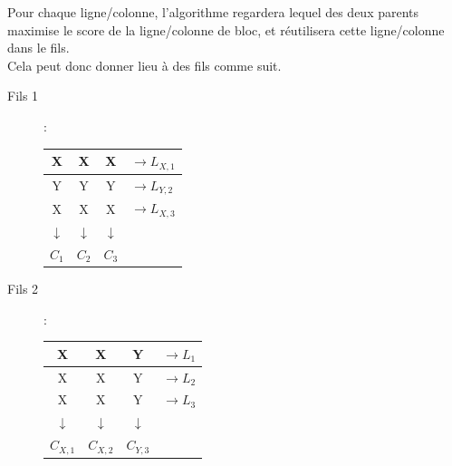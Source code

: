                     Pour chaque ligne/colonne, l'algorithme regardera lequel des deux parents maximise le score de la ligne/colonne de bloc, et réutilisera cette ligne/colonne dans le fils.\\
                    Cela peut donc donner lieu à des fils comme suit.
                    \begin{description}
                        \item[Fils 1]:\\
                            \begin{center}
                                \begin{tabular}{|c|c|c| |l}
                                    \hline
                                    X&X&X&$\rightarrow L_{X,1}$\\
                                    \hline
                                    Y&Y&Y&$\rightarrow L_{Y,2}$\\
                                    \hline
                                    X&X&X&$\rightarrow L_{X,3}$\\
                                    \hline
                                    \hline
                                    $\downarrow$&$\downarrow$&$\downarrow$&\\
                                    $C_1$&$C_2$&$C_3$&\\
                                \end{tabular}
                            \end{center}
                        \item[Fils 2]:\\
                            \begin{center}
                                \begin{tabular}{|c|c|c| |l}
                                    \hline
                                    X&X&Y&$\rightarrow L_1$\\
                                    \hline
                                    X&X&Y&$\rightarrow L_2$\\
                                    \hline
                                    X&X&Y&$\rightarrow L_3$\\
                                    \hline
                                    \hline
                                    $\downarrow$&$\downarrow$&$\downarrow$&\\
                                    $C_{X,1}$&$C_{X,2}$&$C_{Y,3}$&\\
                                \end{tabular}
                            \end{center}
                    \end{description}


